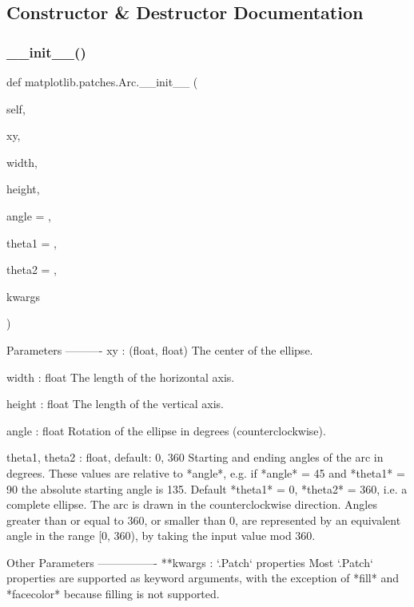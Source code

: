 \subsection{Constructor \& Destructor Documentation}
\mbox{\label{classmatplotlib_1_1patches_1_1Arc_a7330a32b95ef688e532904dd4a70f7cc}} 
\subsubsection{\texorpdfstring{\+\_\+\+\_\+init\+\_\+\+\_\+()}{\_\_init\_\_()}}
{\footnotesize\ttfamily def matplotlib.\+patches.\+Arc.\+\_\+\+\_\+init\+\_\+\+\_\+ (\begin{DoxyParamCaption}\item[{}]{self,  }\item[{}]{xy,  }\item[{}]{width,  }\item[{}]{height,  }\item[{}]{angle = {},  }\item[{}]{theta1 = {},  }\item[{}]{theta2 = {},  }\item[{}]{kwargs }\end{DoxyParamCaption})}

\begin{DoxyVerb}Parameters
----------
xy : (float, float)
    The center of the ellipse.

width : float
    The length of the horizontal axis.

height : float
    The length of the vertical axis.

angle : float
    Rotation of the ellipse in degrees (counterclockwise).

theta1, theta2 : float, default: 0, 360
    Starting and ending angles of the arc in degrees. These values
    are relative to *angle*, e.g. if *angle* = 45 and *theta1* = 90
    the absolute starting angle is 135.
    Default *theta1* = 0, *theta2* = 360, i.e. a complete ellipse.
    The arc is drawn in the counterclockwise direction.
    Angles greater than or equal to 360, or smaller than 0, are
    represented by an equivalent angle in the range [0, 360), by
    taking the input value mod 360.

Other Parameters
----------------
**kwargs : `.Patch` properties
    Most `.Patch` properties are supported as keyword arguments,
    with the exception of *fill* and *facecolor* because filling is
    not supported.

\end{DoxyVerb}
 

